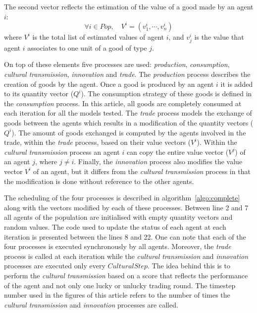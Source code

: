 \documentclass{wscpaperproc}
\begin{document}
The second vector reflects the estimation of the value of a good made by an agent $i$:
$$\forall i \in Pop, \quad V^i = (v^i_1,\cdots,v^i_n) $$
where $V^i$ is the total list of estimated values of agent $i$, and $v^i_j$ is the value that agent $i$ associates to one unit of a good of type $j$.

On top of these elements five processes are used: \emph{production}, \emph{consumption}, \emph{cultural transmission}, \emph{innovation} and \emph{trade}. The \emph{production} process describes the creation of goods by the agent. Once a good is produced by an agent $i$ it is added to its quantity vector ($Q^i$). The consumption strategy of these goods is defined in the \emph{consumption} process. In this article, all goods are completely consumed at each iteration for all the models tested. The \emph{trade} process models the exchange of goods between the agents which results in a modification of the quantity vectors ($Q^i$). The amount of goods exchanged is computed by the agents involved in the trade, within the \emph{trade} process, based on their value vectors ($V^i$). Within the \emph{cultural transmission} process an agent $i$ can copy the entire value vector ($V^j$) of an agent $j$, where $j \neq i$. Finally, the \textit{innovation} process also modifies the value vector $V^i$ of an agent, but it differs from the \emph{cultural transmission} process in that the modification is done without reference to the other agents.

The scheduling of the four processes is described in algorithm~\ref{algo:complete} along with the vectors modified by each of these processes. Between line 2 and 7 all agents of the population are initialised with empty quantity vectors and random values. The code used to update the status of each agent at each iteration is presented between the lines 8 and 22. One can note that each of the four processes is executed synchronously by all agents. Moreover, the \emph{trade} process is called at each iteration while the \emph{cultural transmission} and \emph{innovation} processes are executed only every $CulturalStep$. The idea behind this is to perform the \emph{cultural transmission} based on a score that reflects the performance of the agent and not only one lucky or unlucky trading round. The timestep number used in the figures of this article refers to the number of times the \emph{cultural transmission} and \emph{innovation} processes are called.
\end{document}

